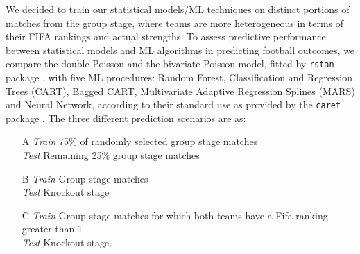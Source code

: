 \documentclass{statsoc}
\begin{document}
 

We decided to train our statistical models/ML techniques on distinct portions of matches from the group stage, where teams are more heterogeneous in terms of their FIFA rankings 
and actual strengths. To assess predictive performance between statistical models and ML algorithms in predicting football outcomes, we compare the double Poisson and the bivariate 
Poisson model, fitted by \texttt{rstan} package \citep{rstan}, with five ML procedures: Random Forest, Classification and Regression Trees (CART), Bagged CART, Multivariate 
Adaptive Regression Splines (MARS) and Neural Network, according to their standard use as provided by the \texttt{caret} package \citep{caret}.
The three different prediction scenarios are as:
%
\begin{enumerate}
\item[A] \emph{Train} 75\% of randomly selected group stage matches \\
\emph{Test}  Remaining 25\% group stage matches
\item[B] \emph{Train}  Group stage matches\\
 \emph{Test}  Knockout stage 
 \item[C] \emph{Train} Group stage matches for which both  teams have a Fifa ranking greater than 1 \\
   \emph{Test}  Knockout stage.
\end{enumerate}
%
\end{document}
